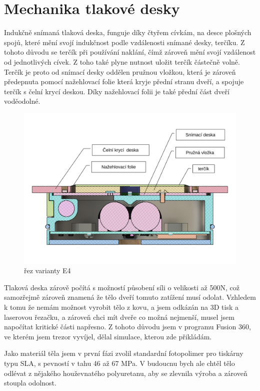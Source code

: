 \section{Mechanika tlakové desky}

Indukčně snímaná tlaková deska, funguje díky čtyřem cívkám, na desce plošných spojů, které mění svojí indukčnost podle vzdálenosti snímané desky, terčíku.
Z tohoto důvodu se terčík při používání naklání, čímž zároveň mění svojí vzdálenost od jednotlivých cívek. Z toho také plyne nutnost uložit terčík
částečně volně. Terčík je proto od snímací desky oddělen pružnou vložkou, která je zároveň předepnuta pomocí nažehlovací folie která kryje přední 
stranu dveří, a spojuje terčík s čelní krycí deskou. Díky nažehlovací folii je také přední část dveří voděodolné.

\begin{figure}[htbp]
    \centering
    \includegraphics[width=\textwidth]{kapitoly/obrazky/E4/machanika_tlakove_desky/rez_po_ose.pdf}
    \caption{řez varianty E4}
    \label{fig:E4-rez}
\end{figure}

Tlaková deska zárově počítá s možností působení síli o velikosti až 500N, což samozřejmě zároveň znamená že tělo dveří tomuto zatížení musí odolat.
Vzhledem k tomu že nemám možnost vyrobit tělo z kovu, a jsem odkázán na 3D tisk a laserovou řezačku, a zároveň chci mít dveře co možná nejmenší,
musel jsem napočítat kritické části napřesno. Z tohoto důvodu jsem v programu Fusion 360, ve kterém jsem trezor vyvíjel,
dělal simulace, kterou zde přikládám. 

Jako materiál těla jsem v první fázi zvolil standardní fotopolimer pro tiskárny typu SLA, s pevností v tahu 46 až 67 MPa.
V budoucnu bych ale chtěl tělo odlévat z nějakého houževnatého polyuretanu, aby se zlevnila výroba a zároveň stoupla odolnost.


